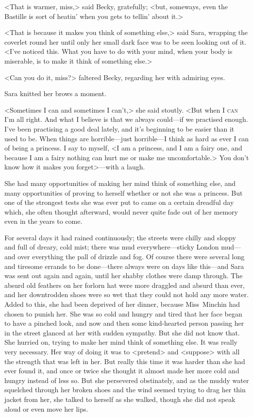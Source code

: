 <That is warmer, miss,> said Becky, gratefully; <but, someways, even the Bastille is sort of heatin' when you gets to tellin' about it.>

<That is because it makes you think of something else,> said Sara, wrapping the coverlet round her until only her small dark face was to be seen looking out of it. <I've noticed this. What you have to do with your mind, when your body is miserable, is to make it think of something else.>

<Can you do it, miss?> faltered Becky, regarding her with admiring eyes.

Sara knitted her brows a moment.

<Sometimes I can and sometimes I can't,> she said stoutly. <But when I \textsc{can} I'm all right. And what I believe is that we always could—if we practised enough. I've been practising a good deal lately, and it's beginning to be easier than it used to be. When things are horrible—just horrible—I think as hard as ever I can of being a princess. I say to myself, <I am a princess, and I am a fairy one, and because I am a fairy nothing can hurt me or make me uncomfortable.> You don't know how it makes you forget>—with a laugh.

She had many opportunities of making her mind think of something else, and many opportunities of proving to herself whether or not she was a princess. But one of the strongest tests she was ever put to came on a certain dreadful day which, she often thought afterward, would never quite fade out of her memory even in the years to come.

For several days it had rained continuously; the streets were chilly and sloppy and full of dreary, cold mist; there was mud everywhere—sticky London mud—and over everything the pall of drizzle and fog. Of course there were several long and tiresome errands to be done—there always were on days like this—and Sara was sent out again and again, until her shabby clothes were damp through. The absurd old feathers on her forlorn hat were more draggled and absurd than ever, and her downtrodden shoes were so wet that they could not hold any more water. Added to this, she had been deprived of her dinner, because Miss~Minchin had chosen to punish her. She was so cold and hungry and tired that her face began to have a pinched look, and now and then some kind-hearted person passing her in the street glanced at her with sudden sympathy. But she did not know that. She hurried on, trying to make her mind think of something else. It was really very necessary. Her way of doing it was to <pretend> and <suppose> with all the strength that was left in her. But really this time it was harder than she had ever found it, and once or twice she thought it almost made her more cold and hungry instead of less so. But she persevered obstinately, and as the muddy water squelched through her broken shoes and the wind seemed trying to drag her thin jacket from her, she talked to herself as she walked, though she did not speak aloud or even move her lips.


